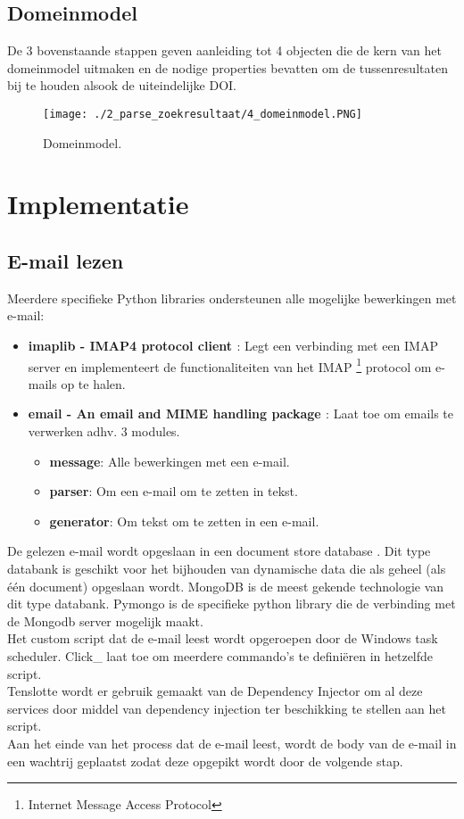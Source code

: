 \subsection{Domeinmodel}
De 3 bovenstaande stappen geven aanleiding tot 4 objecten die de kern van het domeinmodel uitmaken en de nodige properties bevatten om de tussenresultaten bij te houden alsook de uiteindelijke DOI.
\begin{figure}
    \centering
    \texttt{[image: ./2\_parse\_zoekresultaat/4\_domeinmodel.PNG]}
    \caption[Domeinmodel.]{\label{fig:Domeinmodel}Domeinmodel.}
\end{figure}
\FloatBarrier
\section{Implementatie}
\subsection{E-mail lezen}
Meerdere specifieke Python libraries ondersteunen alle mogelijke bewerkingen met e-mail:
\begin{itemize}
    \item \textbf{imaplib - IMAP4 protocol client \autocite{Imaplib2025}}: Legt een verbinding met een IMAP server en implementeert de functionaliteiten van het IMAP \footnote{Internet Message Access Protocol} protocol om e-mails op te halen.\autocite{Imap2025}
    \item \textbf{email - An email and MIME handling package \autocite{Email2025}}: Laat toe om emails te verwerken adhv. 3 modules.
    \begin{itemize}
        \item \textbf{message}: Alle bewerkingen met een e-mail.
        \item \textbf{parser}: Om een e-mail om te zetten in tekst.
        \item \textbf{generator}: Om tekst om te zetten in een e-mail. 
    \end{itemize}
\end{itemize}
De gelezen e-mail wordt opgeslaan in een document store database \autocite{Documentstore2025}. Dit type databank is geschikt voor het bijhouden van dynamische data die als geheel (als één document) opgeslaan wordt. MongoDB \autocite{Mongodb2025} is de meest gekende technologie van dit type databank. Pymongo \autocite{Pymongo2025} is de specifieke python library die de verbinding met de Mongodb server mogelijk maakt.\\
Het custom script dat de e-mail leest wordt opgeroepen door de Windows task scheduler. Click\_ \autocite{Click2025} laat toe om meerdere commando's te definiëren in hetzelfde script.\\
Tenslotte wordt er gebruik gemaakt van de Dependency Injector \autocite{Dependencyinjector2025} om al deze services door middel van dependency injection \autocite{Di2025} ter beschikking te stellen aan het script.\\
Aan het einde van het process dat de e-mail leest, wordt de body van de e-mail in een wachtrij geplaatst zodat deze opgepikt wordt door de volgende stap.

